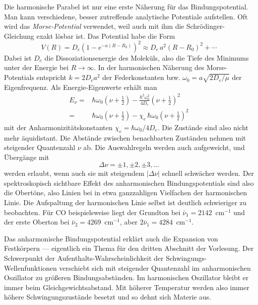 Die harmonische Parabel ist nur eine erste Näherung für das Bindungspotential. Man kann verschiedene, besser zutreffende analytische Potentiale aufstellen. Oft wird das \emph{Morse-Potential} verwendet, weil auch mit ihm  die Schrödinger-Gleichung exakt lösbar ist. Das Potential habe die Form
\begin{equation}
 V(R) = D_e \left( 1 - e^{-a (R - R_0)} \right)^2 \approx D_e \, a^2 (R - R_0)^2 + \cdots
\end{equation}
Dabei ist $D_e$ die Dissoziationsenergie des Moleküls, also die Tiefe des Minimums unter der Energie bei $R \rightarrow \infty$. In der harmonischen Näherung des Morse-Potentials entspricht $k = 2 D_e a^2$ der Federkonstanten bzw. $\omega_0 = a \sqrt{2 D_e / \mu}$ der Eigenfrequenz. Als Energie-Eigenwerte erhält man
\begin{align}
 E_\nu =&  \hbar \omega_0 \left( \nu  + \frac{1}{2} \right)
 - \frac{\hbar^2 \omega_0^2}{4 D_e} \left( \nu  + \frac{1}{2} \right)^2 \\
 = &
 \hbar \omega_0 \left( \nu  + \frac{1}{2} \right)
 - \chi_e \, \hbar \omega_0  \left( \nu  + \frac{1}{2} \right)^2
\end{align}
mit der Anharmonizitätskonstanten $\chi_e =\hbar \omega_0 / 4 D_e$.
Die Zustände sind also nicht mehr äquidistant. Die Abstände zwischen benachbarten Zuständen nehmen mit steigender Quantenzahl $\nu$ ab. Die Auswahlregeln werden auch aufgeweicht, und Übergänge mit 
\begin{equation}
\Delta \nu = \pm 1, \pm 2 , \pm 3, \dots
\end{equation}
werden erlaubt, wenn auch sie mit steigendem $|\Delta \nu |$ schnell schwächer werden. Der spektroskopisch sichtbare Effekt des anharmonischen Bindungspotentials sind also die Obertöne, also Linien bei in etwa ganzzahligen Vielfachen der harmonischen Linie. Die Aufspaltung der harmonischen Linie selbst ist deutlich schwieriger zu beobachten. Für CO beispielsweise liegt der Grundton bei $\bar{\nu}_1 = 2142$~cm$^{-1}$ und der erste Oberton bei 
 $\bar{\nu}_2 = 4269$~cm$^{-1}$, aber $2 \bar{\nu}_1 = 4284$~cm$^{-1}$.
 
Das anharmonische Bindungspotential erklärt auch die Expansion von Festkörpern --- eigentlich ein Thema für den dritten Abschnitt der Vorlesung. Der Schwerpunkt der Aufenthalts-Wahrscheinlichkeit der Schwingungs-Wellenfunktionen verschiebt sich mit steigender Quantenzahl im anharmonischen Oszillator zu größeren Bindungsabständen. Im harmonischen Oszillator bleibt er immer beim Gleichgewichtsabstand. Mit höherer Temperatur werden also immer höhere Schwingungszustände besetzt und so dehnt sich Materie aus.


